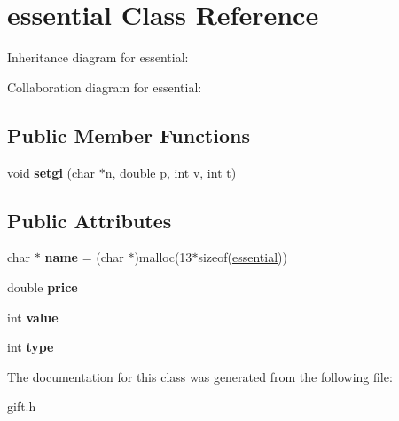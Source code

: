 \hypertarget{classessential}{}\section{essential Class Reference}
\label{classessential}


Inheritance diagram for essential\+:


Collaboration diagram for essential\+:
\subsection*{Public Member Functions}
\begin{DoxyCompactItemize}
\item 
void {\bfseries setgi} (char $\ast$n, double p, int v, int t)\hypertarget{classessential_a814c9d14fd47739f280bd32c2db3f9f9}{}\label{classessential_a814c9d14fd47739f280bd32c2db3f9f9}

\end{DoxyCompactItemize}
\subsection*{Public Attributes}
\begin{DoxyCompactItemize}
\item 
char $\ast$ {\bfseries name} = (char $\ast$)malloc(13$\ast$sizeof(\hyperlink{classessential}{essential}))\hypertarget{classessential_afd92df6c6cd6e7c554271c6f2cbfa7a9}{}\label{classessential_afd92df6c6cd6e7c554271c6f2cbfa7a9}

\item 
double {\bfseries price}\hypertarget{classessential_addf576de1286e2a0cd780d5dc89f6a4f}{}\label{classessential_addf576de1286e2a0cd780d5dc89f6a4f}

\item 
int {\bfseries value}\hypertarget{classessential_a01b944742e4b065fc04fae3d592ac957}{}\label{classessential_a01b944742e4b065fc04fae3d592ac957}

\item 
int {\bfseries type}\hypertarget{classessential_aa836c8a584f2f80d9193099a86c752c0}{}\label{classessential_aa836c8a584f2f80d9193099a86c752c0}

\end{DoxyCompactItemize}


The documentation for this class was generated from the following file\+:\begin{DoxyCompactItemize}
\item 
gift.\+h\end{DoxyCompactItemize}
